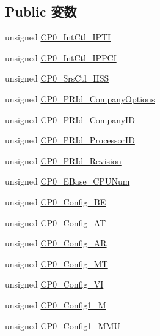 \subsection*{Public 変数}
\begin{DoxyCompactItemize}
\item 
unsigned \hyperlink{structMipsISA_1_1CoreSpecific_a49f0ba2cde4bce93f60fffecf65802a5}{CP0\_\-IntCtl\_\-IPTI}
\item 
unsigned \hyperlink{structMipsISA_1_1CoreSpecific_a1bb9831ab42aa8754926d34017d0e874}{CP0\_\-IntCtl\_\-IPPCI}
\item 
unsigned \hyperlink{structMipsISA_1_1CoreSpecific_abc5fdf67aa83287373e9c274adadd069}{CP0\_\-SrsCtl\_\-HSS}
\item 
unsigned \hyperlink{structMipsISA_1_1CoreSpecific_a4a8c8c26d30b442ecb4ef68acffba7f5}{CP0\_\-PRId\_\-CompanyOptions}
\item 
unsigned \hyperlink{structMipsISA_1_1CoreSpecific_a92f3e962f9c0c2cbc75c3615d81e63ee}{CP0\_\-PRId\_\-CompanyID}
\item 
unsigned \hyperlink{structMipsISA_1_1CoreSpecific_a4a21fd8c6993782ac16e5b545b734c0c}{CP0\_\-PRId\_\-ProcessorID}
\item 
unsigned \hyperlink{structMipsISA_1_1CoreSpecific_aa54bef5c73d244ea8762cc1ef55c2a39}{CP0\_\-PRId\_\-Revision}
\item 
unsigned \hyperlink{structMipsISA_1_1CoreSpecific_a6ffe45285d049b49b8b58c7af637347b}{CP0\_\-EBase\_\-CPUNum}
\item 
unsigned \hyperlink{structMipsISA_1_1CoreSpecific_a10c6dd939391ae8c562440596d062b62}{CP0\_\-Config\_\-BE}
\item 
unsigned \hyperlink{structMipsISA_1_1CoreSpecific_a5bc2eaf3f58d57313591535f93b7970b}{CP0\_\-Config\_\-AT}
\item 
unsigned \hyperlink{structMipsISA_1_1CoreSpecific_a493cb1f69f8f5328ab071c7cc38d0406}{CP0\_\-Config\_\-AR}
\item 
unsigned \hyperlink{structMipsISA_1_1CoreSpecific_a18e534b44bdeff0e9449dd75d5f41fc2}{CP0\_\-Config\_\-MT}
\item 
unsigned \hyperlink{structMipsISA_1_1CoreSpecific_aa0244ec41bc3effd969a3b76733f5713}{CP0\_\-Config\_\-VI}
\item 
unsigned \hyperlink{structMipsISA_1_1CoreSpecific_af3a0e004d738cd0df2b52971687ee86e}{CP0\_\-Config1\_\-M}
\item 
unsigned \hyperlink{structMipsISA_1_1CoreSpecific_aed1337a092ecb47b50aff1a0b3a441de}{CP0\_\-Config1\_\-MMU}
\item 

\end{DoxyCompactItemize}
